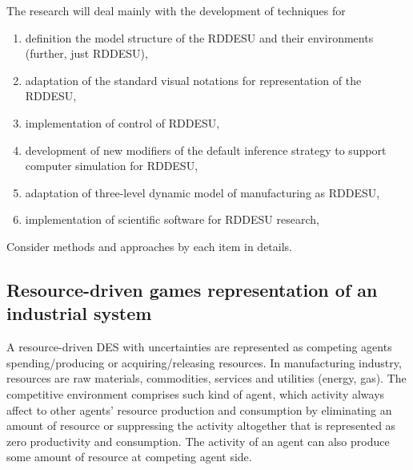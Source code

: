 \documentclass[runningheads]{llncs}
\begin{document}

The research will deal mainly with the development of techniques for
\begin{enumerate}
\item definition the model structure of the RDDESU and their environments (further, just RDDESU),
\item adaptation of the standard visual notations for representation of the RDDESU,
\item implementation of control of RDDESU,
\item development of new modifiers of the default inference strategy to support computer simulation for RDDESU,
\item adaptation of three-level dynamic model of manufacturing as RDDESU,
\item implementation of scientific software for RDDESU research,
\end{enumerate}

Consider methods and approaches by each item in details.

\subsection{Resource-driven games representation of an industrial system}
\label{sec:sub-rbg}

A resource-driven DES with uncertainties are represented as competing agents spending/producing or acquiring/releasing resources. In manufacturing industry, resources are raw materials, commodities, services and utilities (energy, gas). The competitive environment comprises such kind of agent, which activity always affect to other agents' resource production and consumption by eliminating an amount of resource or suppressing the activity altogether that is represented as zero productivity and consumption. The activity of an agent can also produce some amount of resource at competing agent side.
\end{document}

